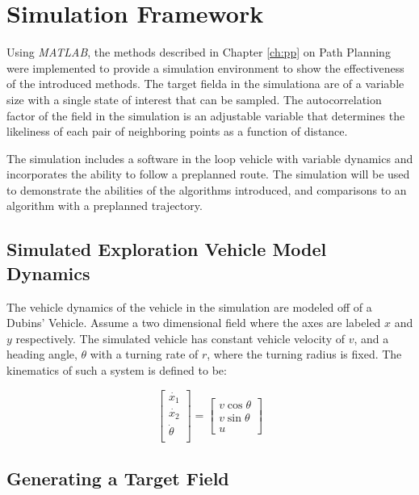 \chapter{Simulation Framework}
Using \textit{MATLAB}, the methods described in Chapter \ref{ch:pp} on Path Planning were implemented to provide a simulation environment to show the effectiveness of the introduced methods. The target fielda in the simulationa are of a variable size with a single state of interest that can be sampled. The autocorrelation factor of the field in the simulation is an adjustable variable that determines the likeliness of each pair of neighboring points as a function of distance. 

The simulation includes a software in the loop vehicle with variable dynamics and incorporates the ability to follow a preplanned route. The simulation will be used to demonstrate the abilities of the algorithms introduced, and comparisons to an algorithm with a preplanned trajectory. 

\section{Simulated Exploration Vehicle Model Dynamics}
The vehicle dynamics of the vehicle in the simulation are modeled off of a Dubins' Vehicle. Assume a two dimensional field where the axes are labeled $x$ and $y$ respectively. The simulated vehicle has constant vehicle velocity of $v$, and a heading angle, $\theta$ with a turning rate of $r$, where the turning radius is fixed. The kinematics of such a system is defined to be:

\begin{equation}
	\begin{bmatrix}
		\dot{x_1} \\
		\dot{x_2} \\
		\dot{\theta} \\
	\end{bmatrix} = 
	\begin{bmatrix}
		v \cos \theta \\
		v \sin \theta \\
		u
	\end{bmatrix}
\end{equation}

\section{Generating a Target Field}

